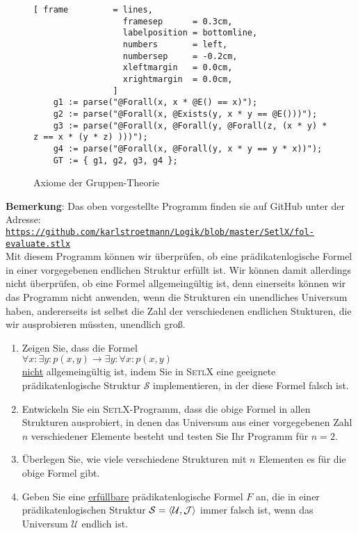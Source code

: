 \begin{figure}[!ht]
\centering
\begin{Verbatim}[ frame         = lines, 
                  framesep      = 0.3cm, 
                  labelposition = bottomline,
                  numbers       = left,
                  numbersep     = -0.2cm,
                  xleftmargin   = 0.0cm,
                  xrightmargin  = 0.0cm,
                ]
    g1 := parse("@Forall(x, x * @E() == x)");
    g2 := parse("@Forall(x, @Exists(y, x * y == @E()))");
    g3 := parse("@Forall(x, @Forall(y, @Forall(z, (x * y) * z == x * (y * z) )))");
    g4 := parse("@Forall(x, @Forall(y, x * y == y * x))");
    GT := { g1, g2, g3, g4 };
\end{Verbatim}
\vspace*{-0.3cm}
\caption{Axiome der Gruppen-Theorie}
\label{fig:gruppen-theorie.stl}
\end{figure}

\noindent
\textbf{Bemerkung}:  Das oben vorgestellte Programm finden sie auf GitHub unter der Adresse:
\\[0.2cm]
\hspace*{0.8cm}
\href{https://github.com/karlstroetmann/Logik/blob/master/SetlX/fol-evaluate.stlx}{\texttt{https://github.com/karlstroetmann/Logik/blob/master/SetlX/fol-evaluate.stlx}}
\\[0.2cm]
Mit diesem Programm k\"{o}nnen wir \"{u}berpr\"{u}fen, ob eine
pr\"{a}dikatenlogische Formel in einer vorgegebenen endlichen Struktur erf\"{u}llt ist. Wir k\"{o}nnen damit
allerdings nicht \"{u}berpr\"{u}fen, ob eine Formel allgemeing\"{u}ltig ist, denn einerseits k\"{o}nnen
wir das Programm nicht anwenden, wenn die Strukturen ein unendliches Universum haben,
andererseits ist selbst die Zahl der verschiedenen endlichen Stukturen, die wir ausprobieren
m\"{u}ssten, unendlich gro\ss{}.  \eox

\exercise
\begin{enumerate}
\item Zeigen Sie, dass die Formel
      \\[0.2cm]
      \hspace*{1.3cm}
      $\forall x: \exists y: p(x,y) \rightarrow \exists y: \forall x: p(x,y)$
      \\[0.2cm]
      \underline{nicht} allgemeing\"{u}ltig ist, indem Sie in \textsc{SetlX} eine geeignete
      pr\"{a}dikatenlogische Struktur $\mathcal{S}$ implementieren, in der diese Formel falsch ist.
\item Entwickeln Sie ein \textsc{SetlX}-Programm, dass die obige Formel in allen Strukturen
      ausprobiert, in denen das Universum  aus einer vorgegebenen Zahl $n$ verschiedener Elemente
      besteht und testen Sie Ihr Programm f\"{u}r $n=2$.
\item \"{U}berlegen Sie, wie viele verschiedene Strukturen mit $n$ Elementen es f\"{u}r die obige Formel gibt.
\item Geben Sie eine \underline{erf\"{u}llbare} pr\"{a}dikatenlogische Formel $F$ an, die in einer pr\"{a}dikatenlogischen
      Struktur $\mathcal{S} = \pair(\mathcal{U},\mathcal{J})$ immer falsch ist, wenn das Universum
      $\mathcal{U}$ endlich ist.  \exend  
\end{enumerate}

